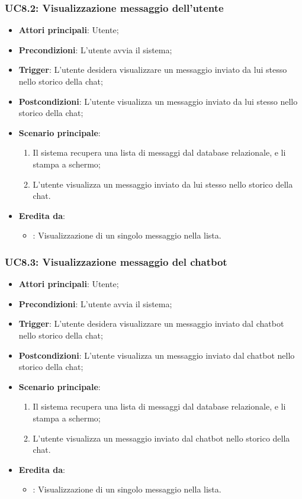 \subsubsection{UC8.2: Visualizzazione messaggio dell'utente}
\begin{itemize}
    \item \textbf{Attori principali}: Utente;
    \item \textbf{Precondizioni}: L'utente avvia il sistema;
    \item \textbf{Trigger}: L'utente desidera visualizzare un messaggio inviato da lui stesso nello storico della chat;
    \item \textbf{Postcondizioni}: L'utente visualizza un messaggio inviato da lui stesso nello storico della chat;
    \item \textbf{Scenario principale}:
    \begin{enumerate}
        \item Il sistema recupera una lista di messaggi dal database relazionale, e li stampa a schermo;
        \item L'utente visualizza un messaggio inviato da lui stesso nello storico della chat.
    \end{enumerate}
    \item \textbf{Eredita da}:
    \begin{itemize}
        \item {}: Visualizzazione di un singolo messaggio nella lista.
    \end{itemize}
\end{itemize}

\hypertarget{UC8.3}{}
\subsubsection{UC8.3: Visualizzazione messaggio del chatbot}
\begin{itemize}
    \item \textbf{Attori principali}: Utente;
    \item \textbf{Precondizioni}: L'utente avvia il sistema;
    \item \textbf{Trigger}: L'utente desidera visualizzare un messaggio inviato dal chatbot nello storico della chat;
    \item \textbf{Postcondizioni}: L'utente visualizza un messaggio inviato dal chatbot nello storico della chat;
    \item \textbf{Scenario principale}:
    \begin{enumerate}
        \item Il sistema recupera una lista di messaggi dal database relazionale, e li stampa a schermo;
        \item L'utente visualizza un messaggio inviato dal chatbot nello storico della chat.
    \end{enumerate}
    \item \textbf{Eredita da}:
    \begin{itemize}
        \item {}: Visualizzazione di un singolo messaggio nella lista.
    \end{itemize}
\end{itemize}

